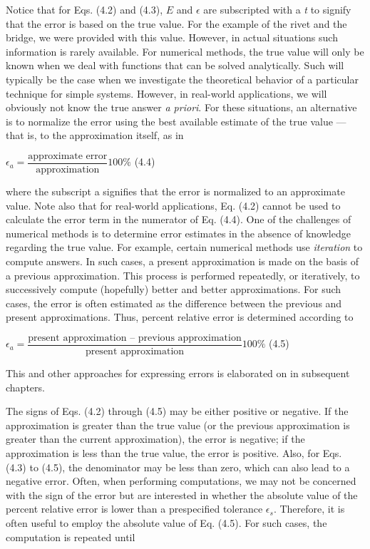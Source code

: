 \documentclass[../main.tex]{subfiles}
\begin{document}
Notice that for Eqs. (4.2) and (4.3), $E$ and $\epsilon$ are subscripted with a \emph{t} to signify that the
error is based on the true value. For the example of the rivet and the bridge, we were provided
with this value. However, in actual situations such information is rarely available.
For numerical methods, the true value will only be known when we deal with functions that
can be solved analytically. Such will typically be the case when we investigate the theoretical
behavior of a particular technique for simple systems. However, in real-world applications,
we will obviously not know the true answer \emph{a priori}. For these situations, an
alternative is to normalize the error using the best available estimate of the true value --- that
is, to the approximation itself, as in
\newline

$\epsilon_a = \dfrac{\text{approximate error}}{\text{approximation}}100\%$
\hfill
(4.4)
\newline

\noindent
where the subscript a signifies that the error is normalized to an approximate value. Note
also that for real-world applications, Eq. (4.2) cannot be used to calculate the error term in
the numerator of Eq. (4.4). One of the challenges of numerical methods is to determine
error estimates in the absence of knowledge regarding the true value. For example, certain
numerical methods use \emph{iteration} to compute answers. In such cases, a present approximation
is made on the basis of a previous approximation. This process is performed repeatedly,
or iteratively, to successively compute (hopefully) better and better approximations.
For such cases, the error is often estimated as the difference between the previous and present
approximations. Thus, percent relative error is determined according to
\newline

$\epsilon_a = \dfrac{\text{present approximation -- previous approximation}}
{\text{present approximation}}100\%$
\hfill
(4.5)
\newline

\noindent
This and other approaches for expressing errors is elaborated on in subsequent chapters.

The signs of Eqs. (4.2) through (4.5) may be either positive or negative. If the approximation
is greater than the true value (or the previous approximation is greater than the current
approximation), the error is negative; if the approximation is less than the true value,
the error is positive. Also, for Eqs. (4.3) to (4.5), the denominator may be less than zero,
which can also lead to a negative error. Often, when performing computations, we may not
be concerned with the sign of the error but are interested in whether the absolute value of the
percent relative error is lower than a prespecified tolerance $\epsilon_s$. Therefore, it is often useful
to employ the absolute value of Eq. (4.5). For such cases, the computation is repeated until
\newline
\end{document}
